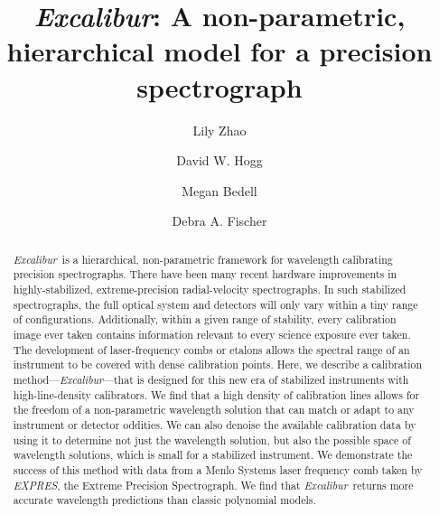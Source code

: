 \documentclass[twocolumn]{aastex63}
\newcommand{\project}[1]{\textsl{#1}}
\newcommand{\name}{\project{Excalibur}}
\newcommand{\acronym}[1]{{\small{#1}}}
\newcommand{\expres}{\project{\acronym{EXPRES}}}
\begin{document}
\title{\name:
A non-parametric, hierarchical model for a precision spectrograph}


\author[0000-0002-3852-3590]{Lily Zhao}

\author[0000-0003-2866-9403]{David W. Hogg}

\author[0000-0001-9907-7742]{Megan Bedell}

\author[0000-0003-2221-0861]{Debra A. Fischer}

\begin{abstract}
\name\ is a hierarchical, non-parametric framework for wavelength calibrating precision spectrographs.  There have been many recent hardware improvements in highly-stabilized, extreme-precision radial-velocity spectrographs.  In such stabilized spectrographs, the full optical system and detectors will only vary within a tiny range of configurations.  Additionally, within a given range of stability, every calibration image ever taken contains information relevant to every science exposure ever taken.  The development of laser-frequency combs or etalons allows the spectral range of an instrument to be covered with dense calibration points.  Here, we describe a calibration method---\name---that is designed for this new era of stabilized instruments with high-line-density calibrators.  We find that a high density of calibration lines allows for the freedom of a non-parametric wavelength solution that can match or adapt to any instrument or detector oddities.  We can also denoise the available calibration data by using it to determine not just the wavelength solution, but also the possible space of wavelength solutions, which is small for a stabilized instrument.  We demonstrate the success of this method with data from a Menlo Systems laser frequency comb taken by \expres, the Extreme Precision Spectrograph.  We find that \name\ returns more accurate wavelength predictions than classic polynomial models.
\end{abstract}
\end{document}
